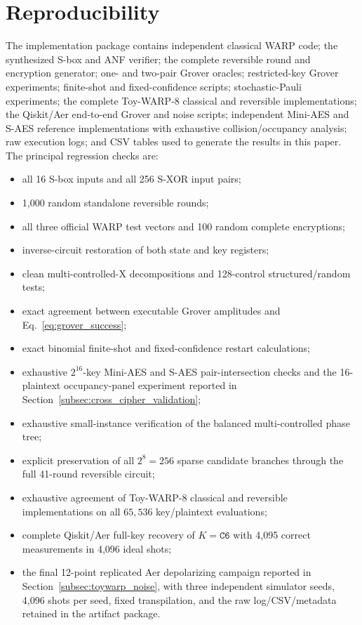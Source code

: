 \documentclass[10pt,a4paper]{article}
\begin{document}
\section{Reproducibility}

The implementation package contains independent classical WARP code; the synthesized S-box and ANF verifier; the complete reversible round and encryption generator; one- and two-pair Grover oracles; restricted-key Grover experiments; finite-shot and fixed-confidence scripts; stochastic-Pauli experiments; the complete Toy-WARP-8 classical and reversible implementations; the Qiskit/Aer end-to-end Grover and noise scripts; independent Mini-AES and S-AES reference implementations with exhaustive collision/occupancy analysis; raw execution logs; and CSV tables used to generate the results in this paper. The principal regression checks are:
\begin{itemize}
    \item all 16 S-box inputs and all 256 S-XOR input pairs;
    \item 1,000 random standalone reversible rounds;
    \item all three official WARP test vectors and 100 random complete encryptions;
    \item inverse-circuit restoration of both state and key registers;
    \item clean multi-controlled-X decompositions and 128-control structured/random tests;
    \item exact agreement between executable Grover amplitudes and Eq.~\eqref{eq:grover_success};
    \item exact binomial finite-shot and fixed-confidence restart calculations;
    \item exhaustive $2^{16}$-key Mini-AES and S-AES pair-intersection checks and the 16-plaintext occupancy-panel experiment reported in Section~\ref{subsec:cross_cipher_validation};
    \item exhaustive small-instance verification of the balanced multi-controlled phase tree;
    \item explicit preservation of all $2^8=256$ sparse candidate branches through the full 41-round reversible circuit;
    \item exhaustive agreement of Toy-WARP-8 classical and reversible implementations on all $65{,}536$ key/plaintext evaluations;
    \item complete Qiskit/Aer full-key recovery of $K=\mathtt{C6}$ with 4,095 correct measurements in 4,096 ideal shots;
    \item the final 12-point replicated Aer depolarizing campaign reported in Section~\ref{subsec:toywarp_noise}, with three independent simulator seeds, 4,096 shots per seed, fixed transpilation, and the raw log/CSV/metadata retained in the artifact package.
\end{itemize}
\end{document}
